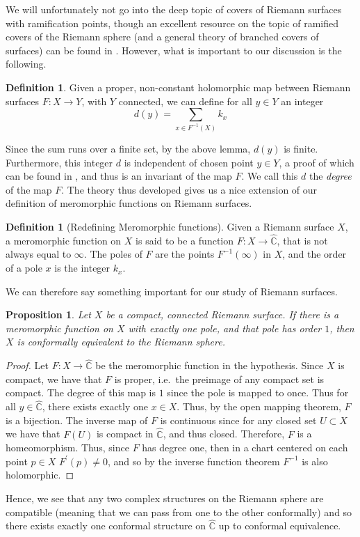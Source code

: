 \documentclass[11pt]{report}
\newtheorem{prop}[thm]{Proposition}
\theoremstyle{definition}
\newtheorem{defn}[thm]{Definition}
\begin{document}
We will unfortunately not go into the deep topic of covers of Riemann surfaces with ramification points, though an excellent resource on the topic of ramified covers of the Riemann sphere (and a general theory of branched covers of surfaces) can be found in \cite{algebra}. However, what is important to our discussion is the following.
\begin{defn}
  Given a proper, non-constant holomorphic map between Riemann surfaces $F:X \rightarrow Y$, with $Y$ connected, we can define for all $y\in Y$ an integer \[ d(y) = \sum\limits_{x \in F^{-1}(X)}k_x \]
\end{defn}
Since the sum runs over a finite set, by the above lemma, $d(y)$ is finite. Furthermore, this integer $d$ is independent of chosen point $y \in Y$, a proof of which can be found in \cite[Proposition 7]{donaldson}, and thus is an invariant of the map $F$. We call this $d$ the \emph{degree} of the map $F$. The theory thus developed gives us a nice extension of our definition of meromorphic functions on Riemann surfaces.
\begin{defn}[Redefining Meromorphic functions]
  Given a Riemann surface $X$, a meromorphic function on $X$ is said to be a function $F:X\rightarrow \widehat{\mathbb{C}}$, that is not always equal to $\infty$. The poles of $F$ are the points $F^{-1}(\infty)$ in $X$, and the order of a pole $x$ is the integer $k_x$. 
\end{defn}
We can therefore say something important for our study of Riemann surfaces.
\begin{prop}
  Let $X$ be a compact, connected Riemann surface. If there is a meromorphic function on $X$ with exactly one pole, and that pole has order $1$, then $X$ is conformally equivalent to the Riemann sphere.
\end{prop}
\begin{proof}
  Let $F:X \rightarrow \widehat{\mathbb{C}}$ be the meromorphic function in the hypothesis. Since $X$ is compact, we have that $F$ is proper, i.e.\ the preimage of any compact set is compact. The degree of this map is $1$ since the pole is mapped to once. Thus for all $y \in \widehat{\mathbb{C}}$, there exists exactly one $x \in X$. Thus, by the open mapping theorem, $F$ is a bijection. The inverse map of $F$ is continuous since for any closed set $U \subset X$ we have that $F(U)$ is compact in $\widehat{\mathbb{C}}$, and thus closed. Therefore, $F$ is a homeomorphism. Thus, since $F$ has degree one, then in a chart centered on each point $p \in X$ $F^{\prime}(p)\neq 0$, and so by the inverse function theorem $F^{-1}$ is also holomorphic. 
\end{proof}
Hence, we see that any two complex structures on the Riemann sphere are compatible (meaning that we can pass from one to the other conformally) and so there exists exactly one conformal structure on $\widehat{\mathbb{C}}$ up to conformal equivalence.
\end{document}
